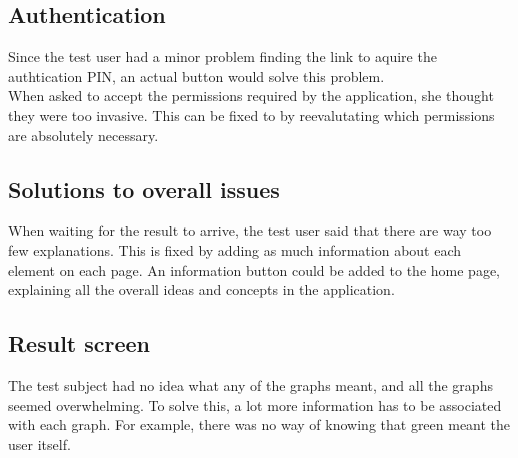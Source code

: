 \subsection{Authentication}
Since the test user had a minor problem finding the link to aquire the
authtication PIN, an actual button would solve this problem.\\
When asked to accept the permissions required by the application, she thought
they were too invasive. This can be fixed to by reevalutating which permissions
are absolutely necessary.

\subsection{Solutions to overall issues}
When waiting for the result to arrive, the test user said that there are way too
few explanations. This is fixed by adding as much information about each element
on each page. An information button could be added to the home page, explaining
all the overall ideas and concepts in the application.

\subsection{Result screen}
The test subject had no idea what any of the graphs meant, and all the graphs
seemed overwhelming. To solve this, a lot more information has to be
associated with each graph. For example, there was no way of knowing that green
meant the user itself. 






















